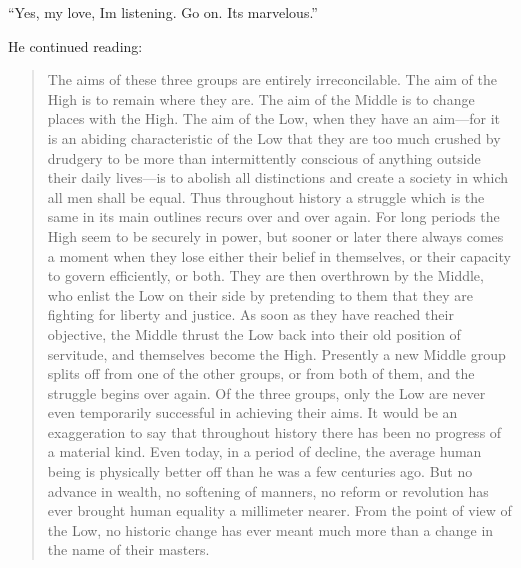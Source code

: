 ``Yes, my love, I\textquotesingle m listening. Go on.
It\textquotesingle s marvelous.''

He continued reading:

\begin{quotation}
The aims of these three groups are entirely irreconcilable. The aim of
the High is to remain where they are. The aim of the Middle is to change
places with the High. The aim of the Low, when they have an aim---for it
is an abiding characteristic of the Low that they are too much crushed
by drudgery to be more than intermittently conscious of anything outside
their daily lives---is to abolish all distinctions and create a society
in which all men shall be equal. Thus throughout history a struggle
which is the same in its main outlines recurs over and over again. For
long periods the High seem to be securely in power, but sooner or later
there always comes a moment when they lose either their belief in
themselves, or their capacity to govern efficiently, or both. They are
then overthrown by the Middle, who enlist the Low on their side by
pretending to them that they are fighting for liberty and justice. As
soon as they have reached their objective, the Middle thrust the Low
back into their old position of servitude, and themselves become the
High. Presently a new Middle group splits off from one of the other
groups, or from both of them, and the struggle begins over again. Of the
three groups, only the Low are never even temporarily successful in
achieving their aims. It would be an exaggeration to say that throughout
history there has been no progress of a material kind. Even today, in a
period of decline, the average human being is physically better off than
he was a few centuries ago. But no advance in wealth, no softening of
manners, no reform or revolution has ever brought human equality a
millimeter nearer. From the point of view of the Low, no historic change
has ever meant much more than a change in the name of their masters.


\end{quotation}
